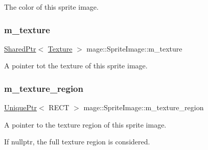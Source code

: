 The color of this sprite image. \hypertarget{classmage_1_1_sprite_image_a8416fc862782dc019e15275261e7ca15}{}\label{classmage_1_1_sprite_image_a8416fc862782dc019e15275261e7ca15} 
\subsubsection{\texorpdfstring{m\+\_\+texture}{m\_texture}}
{\footnotesize\ttfamily \hyperlink{namespacemage_a1e01ae66713838a7a67d30e44c67703e}{Shared\+Ptr}$<$ \hyperlink{classmage_1_1_texture}{Texture} $>$ mage\+::\+Sprite\+Image\+::m\+\_\+texture\hspace{0.3cm}{\ttfamily [private]}}

A pointer tot the texture of this sprite image. \hypertarget{classmage_1_1_sprite_image_a8d20ef6d6470dc01f73a599060953b65}{}\label{classmage_1_1_sprite_image_a8d20ef6d6470dc01f73a599060953b65} 
\subsubsection{\texorpdfstring{m\+\_\+texture\+\_\+region}{m\_texture\_region}}
{\footnotesize\ttfamily \hyperlink{namespacemage_a8c307fbcc33bce9b7f2aa4c26c3b95cf}{Unique\+Ptr}$<$ R\+E\+CT $>$ mage\+::\+Sprite\+Image\+::m\+\_\+texture\+\_\+region\hspace{0.3cm}{\ttfamily [private]}}

A pointer to the texture region of this sprite image.

If {\ttfamily nullptr}, the full texture region is considered. 